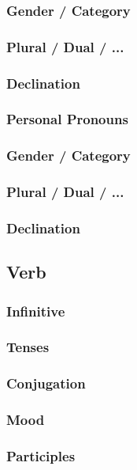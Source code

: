 \documentclass[12pt,a4paper]{article}
\begin{document}
		\subsubsection{Gender / Category}
		\subsubsection{Plural / Dual / ...}
		\subsubsection{Declination}
		
	\subsubsection{Personal Pronouns}
		\subsubsection{Gender / Category}
		\subsubsection{Plural / Dual / ...}
		\subsubsection{Declination}
		
	\subsection{Verb}
		\subsubsection{Infinitive}
		\subsubsection{Tenses}
		\subsubsection{Conjugation}
		\subsubsection{Mood}
		\subsubsection{Participles}
		
\end{document}
